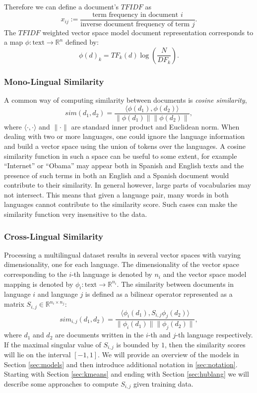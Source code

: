 \documentclass[twoside,11pt]{article}
\newcommand{\RR}{\mathbb{R}}
\begin{document}
Therefore we can define a document's $TFIDF$ as
$$ x_{ij}  := \frac{\mbox{term frequency in document } i}{\mbox{inverse document frequency of term } j}.$$
The $TFIDF$ weighted vector space model document representation corresponds to a map $\phi : \text{text} \rightarrow \RR^n$ defined by:
$$\phi(d)_k = {TF}_k(d) \log\left( \frac{N}{{DF}_k}\right).$$

\subsubsection{Mono-Lingual Similarity}
A common way of computing similarity between documents is \emph{cosine similarity},
$$sim(d_1, d_2) = \frac{\langle \phi(d_1), \phi(d_2)\rangle}{\|\phi(d_1)\| \|\phi(d_2)\|},$$
where $\langle \cdot,\cdot \rangle$ and $\|\cdot\|$ are standard inner product and Euclidean norm. When dealing with two or more languages, one could ignore the language information
and build a vector space using the union of tokens over the languages. A cosine similarity function in such a space can be useful to some extent, for example ``Internet'' or ``Obama'' may appear both in Spanish and English texts and the presence of such terms in both an English and a Spanish document would contribute to their similarity. In general however, large parts of vocabularies may not intersect. This means that given a language pair, many words in both languages cannot contribute to the similarity score. Such cases can make the similarity function very insensitive to the data.

\subsubsection{Cross-Lingual Similarity}
Processing a multilingual dataset results in several vector spaces with varying dimensionality, one for each language. The dimensionality of the vector space corresponding to the $i$-th language is denoted by $n_i$ and the vector space model mapping is denoted by $\phi_i : \text{text} \rightarrow \RR^{n_i}$.
The similarity between documents in language $i$ and language $j$ is defined as a bilinear operator represented as a matrix $S_{i,j} \in \RR^{n_i \times n_j}$:
$$sim_{i,j}(d_1, d_2) = \frac{ \langle \phi_i (d_1), S_{i,j} \phi_j (d_2) \rangle }{\|\phi_i(d_1)\| \|\phi_j(d_2)\|},$$
where $d_1$ and $d_2$ are documents written in the $i$-th and $j$-th language respectively. If the maximal singular value of $S_{i,j}$ is bounded by $1$, then the similarity scores will lie on the interval $[-1, 1]$. We will provide an overview of the models in Section \ref{sec:models} and then introduce additional notation in \ref{sec:notation}. Starting with Section \ref{sec:kmeans} and ending with Section \ref{sec:hublang} we will describe some approaches to compute $S_{i,j}$ given training data.
\end{document}
